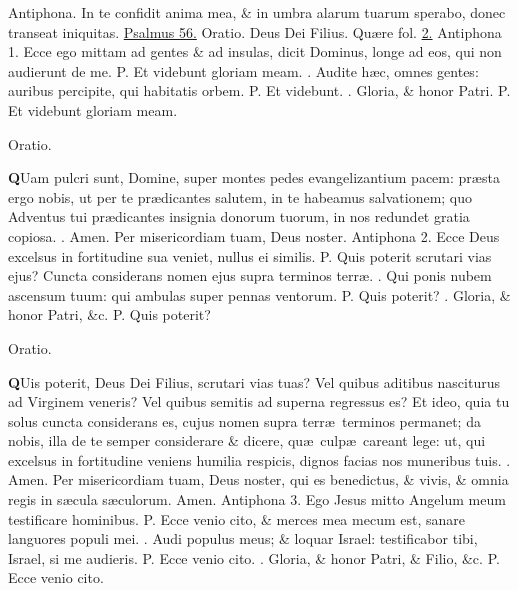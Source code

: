 \documentclass[letter,11pt]{book}
\makeatletter
\DeclareRobustCommand{\Vbar}{\vers@resp{-0.1em}{V}}
\DeclareRobustCommand{\Rbar}{\vers@resp{0pt}{R}}
\newcommand{\vers@resp@sym}{\raisebox{0.2ex}{\rotatebox[origin=c]{-20}{$\m@th\rceil$}}}
\newcommand{\vers@resp}[2]{%
  {\ooalign{\hidewidth\kern#1\vers@resp@sym\hidewidth\cr#2\cr}}%
}%
\def\P{\color{Red} P. \color{black}}
\def\V{\color{Red} \Vbar . \color{black}}
\def\R{\color{Red} \Rbar . \color{black}}
\makeatother
\begin{document}
\begin{multicols}{2}
\par \noindent \color{Red} Antiphona. \color{black} In te confidit anima mea, \& in umbra alarum tuarum sperabo, donec transeat iniquitas. \color{Red} \hyperlink{ps56}{Psalmus 56.} Oratio. \color{black} Deus Dei Filius. \color{Red} Qu\ae re fol. \color{black} \hyperlink{page.2}{2.}
\newline \color{Red} Antiphona 1. \color{black} Ecce ego mittam ad gentes \& ad insulas, dicit Dominus, longe ad eos, qui non audierunt de me. \P Et videbunt gloriam meam. \V Audite h\ae c, omnes gentes: auribus percipite, qui habitatis orbem. \P Et videbunt. \V Gloria, \& honor Patri. \P Et videbunt gloriam meam.
\vspace{-.5em} \begin{center} \color{Red} Oratio. \color{black} \end{center} \vspace{-.5em}
\lettrine[lines=2]{\bfseries \color{Red} Q}{}Uam pulcri sunt, Domine, super montes pedes evangelizantium pacem: pr\ae sta ergo nobis, ut per te pr\ae dicantes salutem, in te habeamus salvationem; quo Adventus tui pr\ae dicantes insignia donorum tuorum, in nos redundet gratia copiosa. \R Amen. Per misericordiam tuam, Deus noster.
\newline \color{Red} Antiphona 2. \color{black} Ecce Deus excelsus in fortitudine sua veniet, nullus ei similis. \P Quis poterit scrutari vias ejus? Cuncta considerans nomen ejus supra terminos terr\ae . \V Qui ponis nubem ascensum tuum: qui ambulas super pennas ventorum. \P Quis poterit? \V Gloria, \& honor Patri, \&c. \P Quis poterit?
\vspace{-.5em} \begin{center} \color{Red} Oratio. \color{black} \end{center} \vspace{-.5em}
\lettrine[lines=2]{\bfseries \color{Red} Q}{}Uis poterit, Deus Dei Filius, scrutari vias tuas? Vel quibus aditibus nasciturus ad Virginem veneris? Vel quibus semitis ad superna regressus es? Et ideo, quia tu solus cuncta considerans es, cujus nomen supra terr\ae \ terminos permanet; da nobis, illa de te semper considerare \& dicere, qu\ae \ culp\ae \ careant lege: ut, qui excelsus in fortitudine veniens humilia respicis, dignos facias nos muneribus tuis. \R Amen. Per misericordiam tuam, Deus noster, qui es benedictus, \& vivis, \& omnia regis in s\ae cula s\ae culorum. Amen.
\newline \color{Red} Antiphona 3. \color{black} Ego Jesus mitto Angelum meum testificare hominibus. \P Ecce venio cito, \& merces mea mecum est, sanare languores populi mei. \V Audi populus meus; \& loquar Israel: testificabor tibi, Israel, si me audieris. \P Ecce venio cito. \V Gloria, \& honor Patri, \& Filio, \&c. \P Ecce venio cito.

\end{multicols}
\end{document}
